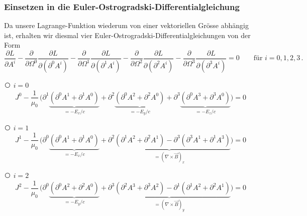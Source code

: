 \subsubsection{Einsetzen in die Euler-Ostrogradski-Differentialgleichung}
Da unsere Lagrange-Funktion wiederum von einer vektoriellen Grösse abhängig ist, erhalten wir diesmal vier Euler-Ostrogradski-Differentialgleichungen von der Form
\[
\frac{\partial L}{\partial A^i} 
- \frac{\partial}{\partial \Omega^0}\frac{\partial L}{\partial(\partial^0 A^i)}
- \frac{\partial}{\partial \Omega^1}\frac{\partial L}{\partial(\partial^1 A^i)}
- \frac{\partial}{\partial \Omega^2}\frac{\partial L}{\partial(\partial^2 A^i)}
- \frac{\partial}{\partial \Omega^3}\frac{\partial L}{\partial(\partial^3 A^i)}
= 0 \qquad \text{für } i=0,1,2,3 \,.
\]

{\larger\textcircled{}} $i = 0$
\[
J^0  -\frac{1}{\mu_0}\,\biggl(\partial^1\underbrace{\left(\partial^0 A^1 + \partial^1 A^0\right)}_{\displaystyle=-E_x/c}
+ \partial^2\underbrace{\left(\partial^0 A^2 + \partial^2 A^0\right)}_{\displaystyle=-E_y/c}
+ \partial^3\underbrace{\left(\partial^0 A^3 + \partial^3 A^0\right)}_{\displaystyle=-E_z/c}\biggr)
=
0
\]

{\larger\textcircled{}} $i = 1$
\[
J^1  -\frac{1}{\mu_0}\,\biggl(\partial^0\underbrace{\left(\partial^0 A^1 + \partial^1 A^0\right)}_{\displaystyle=-E_x/c}
+ \underbrace{\partial^2\left(\partial^1 A^2 + \partial^2 A^1\right)
	- \partial^3\left(\partial^3 A^1 + \partial^1 A^3\right)}_{\displaystyle=(\nabla\times\vec{B})_x}\biggr)
=
0
\]

{\larger\textcircled{}} $i = 2$
\[
J^2  -\frac{1}{\mu_0}\,\biggl(\partial^0\underbrace{\left(\partial^0 A^2 + \partial^2 A^0\right)}_{\displaystyle=-E_y/c}
+ \underbrace{\partial^3\left(\partial^2 A^3 + \partial^3 A^2\right)
	- \partial^1\left(\partial^1 A^2 + \partial^2 A^1\right)}_{\displaystyle=(\nabla\times\vec{B})_y}\biggr)
=
0
\]

